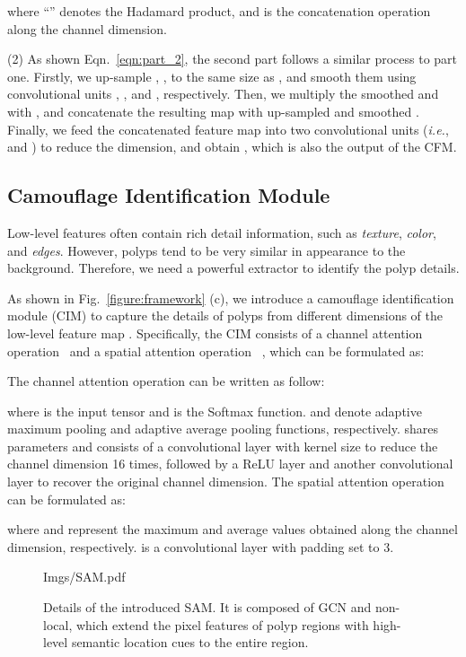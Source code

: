 \documentclass[journal]{IEEEtran}
\begin{document}
where ``'' denotes the Hadamard product, and  is the concatenation operation along the channel dimension.

(2) As shown Eqn.~\ref{eqn:part_2}, the second part follows a similar process to part one. 
Firstly, we up-sample , , 
to the same size as , and smooth them using convolutional units , , and , respectively.
Then, we multiply the smoothed  and  with , and concatenate the resulting map with 
up-sampled and smoothed .
Finally, we feed the concatenated feature map into two convolutional units (\emph{i.e.},  and ) to reduce the dimension, and obtain , which is also the output of the CFM.



\subsection{Camouflage Identification Module}\label{subsec:Camouflage Identification}
Low-level features often contain rich detail 
information, such as \textit{texture}, \textit{color}, and \textit{edges}.
However, polyps tend to be very similar in appearance to the background.
Therefore, we need a powerful extractor to identify the polyp details.

As shown in Fig.~\ref{figure:framework} (c), we introduce a camouflage identification module (CIM) to capture the details of polyps from different dimensions of the low-level feature map .
Specifically, the CIM consists of a channel attention operation~\cite{woo2018cbam}  and a spatial attention operation~\cite{hu2018squeeze} , which can be formulated as:

The channel attention operation  can be written as follow:

where  is the input tensor and  is the Softmax function.  and  denote adaptive maximum pooling and adaptive average pooling functions, respectively.
 shares parameters and consists of a convolutional layer with  kernel size to reduce the channel dimension 16 times, followed by a ReLU layer
and another  convolutional layer to recover the original channel dimension.
The spatial attention operation  can be formulated as:

where  and  represent the maximum and average values obtained along the channel dimension, respectively.
 is a  convolutional layer with padding set to {3}.

\begin{figure}[t!]
	\centering
    \small
    \vspace{5pt}
	\begin{overpic}[width=.98\linewidth]{Imgs/SAM.pdf}
    \end{overpic}
    \vspace{-10pt}
	\caption{Details of the introduced SAM. It is composed of GCN and non-local, which extend the pixel features of polyp regions with high-level semantic location cues to the entire region.}
    \label{figure:module ra}
    \vspace{8pt}
\end{figure}
\end{document}
